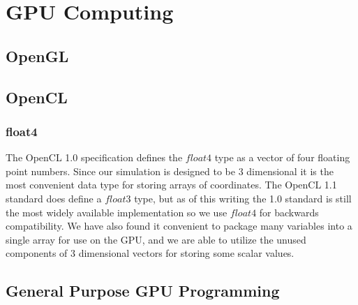 \chapter{GPU Computing}

\section{OpenGL}
\section{OpenCL}

\subsection{float4}
The OpenCL 1.0 specification defines the $float4$ type as a vector of four
floating point numbers. Since our simulation is designed to be 3 dimensional it
is the most convenient data type for storing arrays of coordinates. The OpenCL
1.1 standard does define a $float3$ type, but as of this writing the 1.0
standard is still the most widely available implementation so we use $float4$
for backwards compatibility. We have also found it convenient to package many
variables into a single array for use on the GPU, and we are able to utilize
the unused components of 3 dimensional vectors for storing some scalar values.


\section{General Purpose GPU Programming}


